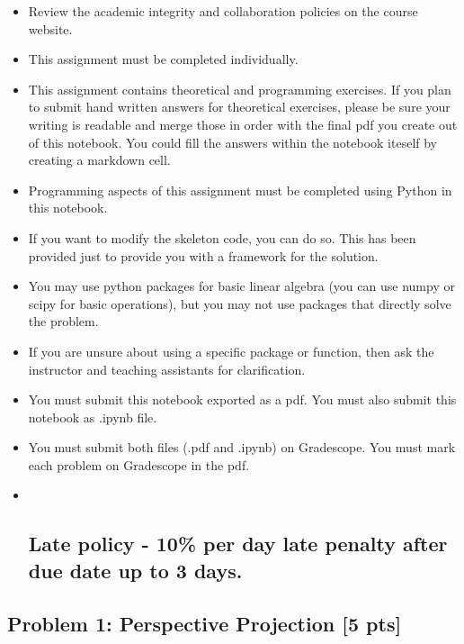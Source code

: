 \documentclass[11pt]{article}
\begin{document}
\begin{itemize}
\item
  Review the academic integrity and collaboration policies on the course
  website.
\item
  This assignment must be completed individually.
\item
  This assignment contains theoretical and programming exercises. If you
  plan to submit hand written answers for theoretical exercises, please
  be sure your writing is readable and merge those in order with the
  final pdf you create out of this notebook. You could fill the answers
  within the notebook iteself by creating a markdown cell.
\item
  Programming aspects of this assignment must be completed using Python
  in this notebook.
\item
  If you want to modify the skeleton code, you can do so. This has been
  provided just to provide you with a framework for the solution.
\item
  You may use python packages for basic linear algebra (you can use
  numpy or scipy for basic operations), but you may not use packages
  that directly solve the problem.
\item
  If you are unsure about using a specific package or function, then ask
  the instructor and teaching assistants for clarification.
\item
  You must submit this notebook exported as a pdf. You must also submit
  this notebook as .ipynb file.
\item
  You must submit both files (.pdf and .ipynb) on Gradescope. You must
  mark each problem on Gradescope in the pdf.
\item ~
  \hypertarget{late-policy---10-per-day-late-penalty-after-due-date-up-to-3-days.}{%
  \subsection{\texorpdfstring{\textbf{Late policy} - 10\% per day late
  penalty after due date up to 3
  days.}{Late policy - 10\% per day late penalty after due date up to 3 days.}}\label{late-policy---10-per-day-late-penalty-after-due-date-up-to-3-days.}}
\end{itemize}

    \hypertarget{problem-1-perspective-projection-5-pts}{%
\subsection{Problem 1: Perspective Projection {[}5
pts{]}}\label{problem-1-perspective-projection-5-pts}}
\end{document}
